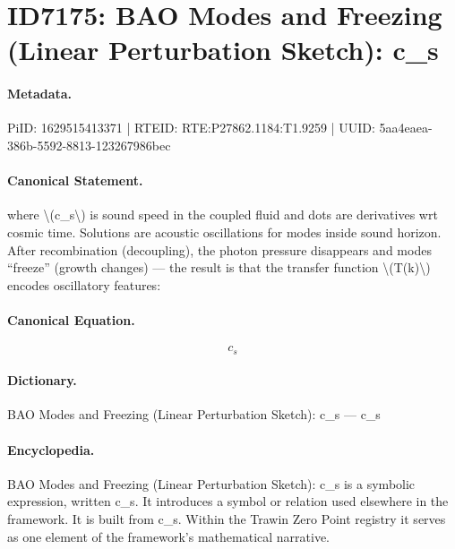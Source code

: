 \section*{ID7175: BAO Modes and Freezing (Linear Perturbation Sketch): c\_s}
\paragraph{Metadata.}
PiID: 1629515413371 | RTEID: RTE:P27862.1184:T1.9259 | UUID: 5aa4eaea-386b-5592-8813-123267986bec

\paragraph{Canonical Statement.}
where \textbackslash{}(c\_s\textbackslash{}) is sound speed in the coupled fluid and dots are derivatives wrt cosmic time. Solutions are acoustic oscillations for modes inside sound horizon. After recombination (decoupling), the photon pressure disappears and modes “freeze” (growth changes) — the result is that the transfer function \textbackslash{}(T(k)\textbackslash{}) encodes oscillatory features:

\paragraph{Canonical Equation.}
\[
c_s
\]

\paragraph{Dictionary.}
BAO Modes and Freezing (Linear Perturbation Sketch): c\_s — c\_s

\paragraph{Encyclopedia.}
BAO Modes and Freezing (Linear Perturbation Sketch): c\_s is a symbolic expression, written c\_s. It introduces a symbol or relation used elsewhere in the framework. It is built from c\_s. Within the Trawin Zero Point registry it serves as one element of the framework's mathematical narrative.
